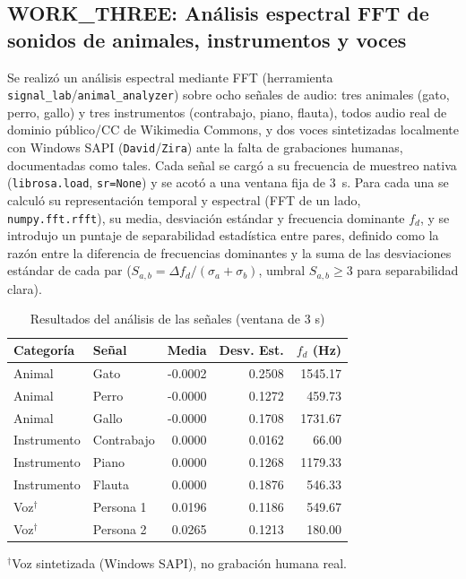 
\subsection{WORK\_THREE: Análisis espectral FFT de sonidos de animales, instrumentos y voces}

Se realizó un análisis espectral mediante FFT (herramienta \texttt{signal\_lab}/\texttt{animal\_analyzer}) sobre ocho señales de audio: tres animales (gato, perro, gallo) y tres instrumentos (contrabajo, piano, flauta), todos audio real de dominio público/CC de Wikimedia Commons, y dos voces sintetizadas localmente con Windows SAPI (\texttt{David}/\texttt{Zira}) ante la falta de grabaciones humanas, documentadas como tales. Cada señal se cargó a su frecuencia de muestreo nativa (\texttt{librosa.load}, \texttt{sr=None}) y se acotó a una ventana fija de $3$~s. Para cada una se calculó su representación temporal y espectral (FFT de un lado, \texttt{numpy.fft.rfft}), su media, desviación estándar y frecuencia dominante $f_d$, y se introdujo un puntaje de separabilidad estadística entre pares, definido como la razón entre la diferencia de frecuencias dominantes y la suma de las desviaciones estándar de cada par ($S_{a,b} = \Delta f_d / (\sigma_a+\sigma_b)$, umbral $S_{a,b}\geq 3$ para separabilidad clara).

\begin{table}[!t]
\centering
\caption{Resultados del análisis de las señales (ventana de 3 s)}
\label{tab:wt-resultados}
\small
\begin{tabular}{@{}l l r r r@{}}
\toprule
Categoría & Señal & Media & Desv. Est. & $f_d$ (Hz) \\
\midrule
Animal & Gato & -0.0002 & 0.2508 & 1545.17 \\
Animal & Perro & -0.0000 & 0.1272 & 459.73 \\
Animal & Gallo & -0.0000 & 0.1708 & 1731.67 \\
\midrule
Instrumento & Contrabajo & 0.0000 & 0.0162 & 66.00 \\
Instrumento & Piano & 0.0000 & 0.1268 & 1179.33 \\
Instrumento & Flauta & 0.0000 & 0.1876 & 546.33 \\
\midrule
Voz$^{\dagger}$ & Persona 1 & 0.0196 & 0.1186 & 549.67 \\
Voz$^{\dagger}$ & Persona 2 & 0.0265 & 0.1213 & 180.00 \\
\bottomrule
\end{tabular}
\vspace{2pt}
{\footnotesize $^{\dagger}$Voz sintetizada (Windows SAPI), no grabación humana real.}
\end{table}

